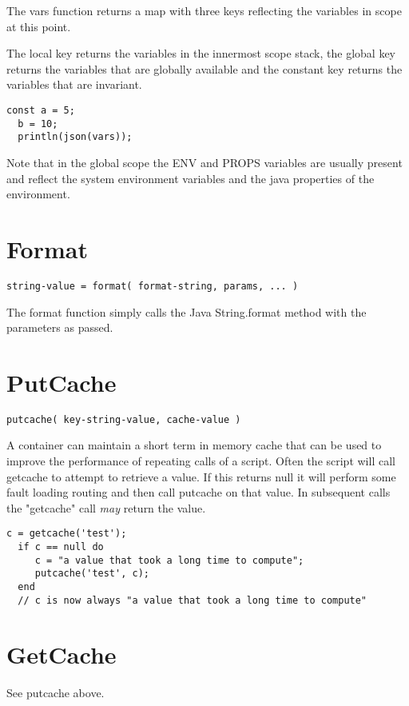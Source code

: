 The vars function returns a map with three keys reflecting the variables in scope at this point.

The local key returns the variables in the innermost scope stack, the global key returns the variables
that are globally available and the constant key returns the variables that are invariant.

\begin{lstlisting}[caption={vars example}]
  const a = 5;
  b = 10;
  println(json(vars));
\end{lstlisting}

Note that in the global scope the ENV and PROPS variables are usually present and reflect the system environment
variables and the java properties of the environment.

\section{Format}
\begin{Verbatim}
string-value = format( format-string, params, ... )
\end{Verbatim}

The format function simply calls the Java String.format method with the parameters
as passed.

\section{PutCache}
\begin{Verbatim}
putcache( key-string-value, cache-value )
\end{Verbatim}

A \Reflex container can maintain a short term in memory cache that can be used
to improve the performance of repeating calls of a script. Often the script will call
getcache to attempt to retrieve a value. If this returns null it will perform some fault loading
routing and then call putcache on that value. In subsequent calls the "getcache" call \emph{may}
return the value.

\begin{lstlisting}[caption={cache example}]
  c = getcache('test');
  if c == null do
     c = "a value that took a long time to compute";
     putcache('test', c);
  end
  // c is now always "a value that took a long time to compute"
\end{lstlisting}

\section{GetCache}
See putcache above.

